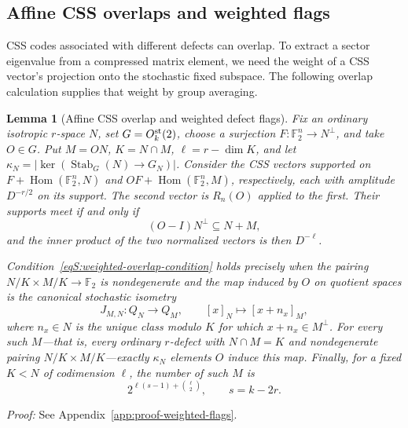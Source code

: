 \documentclass[journal,twocolumn]{IEEEtran}
\newtheorem{lemma}[theorem]{Lemma}
\theoremstyle{definition}
\theoremstyle{plain}
\newcommand{\F}{\mathbb F}
\begin{document}
\subsection{Affine CSS overlaps and weighted flags}
CSS codes associated with different defects can overlap.  To extract a
sector eigenvalue from a compressed matrix element, we need the weight
of a CSS vector's projection onto the stochastic fixed subspace.  The
following overlap calculation supplies that weight by group averaging.

\begin{lemma}[Affine CSS overlap and weighted defect flags]
\label{lemS:weighted-flags}
Fix an ordinary isotropic $r$-space $N$, set $G=O_k^{\rm st}(2)$, choose a
surjection $F:\F_2^n\to N^\perp$, and take $O\in G$.  Put
$M=ON$, $K=N\cap M$, $\ell=r-\dim K$, and let
$\kappa_N=|\ker(\operatorname{Stab}_G(N)\to G_N)|$.
Consider the CSS vectors supported on
$F+\operatorname{Hom}(\F_2^n,N)$ and
$OF+\operatorname{Hom}(\F_2^n,M)$, respectively, each with amplitude
$D^{-r/2}$ on its support.  The second vector is $R_n(O)$ applied to the
first.  Their supports meet if and only if
\begin{equation}
 (O-I)N^\perp\subseteq N+M,
 \label{eqS:weighted-overlap-condition}
\end{equation}
and the inner product of the two normalized vectors is then $D^{-\ell}$.

Condition~\eqref{eqS:weighted-overlap-condition} holds precisely when the
pairing $N/K\times M/K\to\F_2$ is nondegenerate and the map induced by $O$
on quotient spaces is the canonical stochastic isometry
\begin{equation}
 J_{M,N}:Q_N\longrightarrow Q_M,
 \qquad [x]_N\longmapsto[x+n_x]_M,
 \label{eqS:weighted-canonical-map}
\end{equation}
where $n_x\in N$ is the unique class modulo $K$ for which
$x+n_x\in M^\perp$.  For every such $M$---that is, every ordinary
$r$-defect with $N\cap M=K$ and nondegenerate pairing
$N/K\times M/K$---exactly $\kappa_N$ elements $O$ induce this map.
Finally, for a fixed $K<N$ of codimension $\ell$,
the number of such $M$ is
\begin{equation}
 2^{\ell(s-1)+\binom\ell2},
 \qquad s=k-2r.
 \label{eqS:weighted-flag-count}
\end{equation}
\end{lemma}

\noindent\emph{Proof:} See Appendix~\ref{app:proof-weighted-flags}.\par
\end{document}
